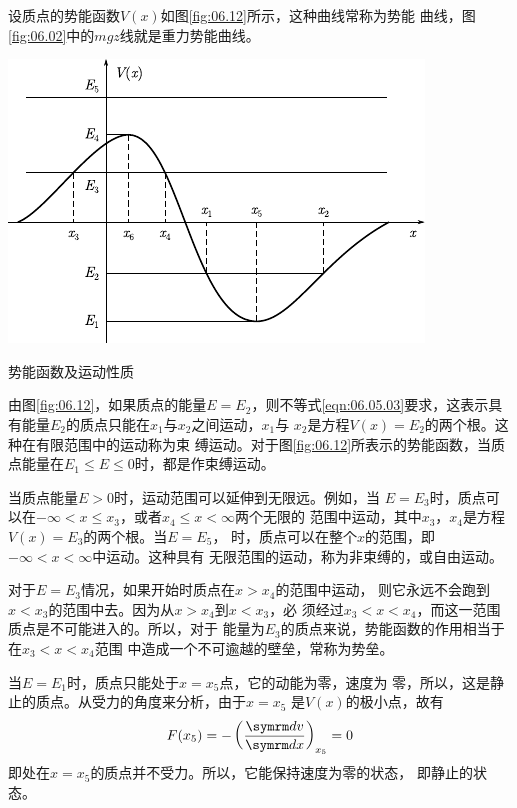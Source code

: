 设质点的势能函数$  V ( x )   $如图\ref{fig:06.12}\;所示，这种曲线常称为势能
曲线，图\ref{fig:06.02}\;中的$ mgz $线就是重力势能曲线。
\begin{figurex}
    \centering
    \includegraphics{figure/fig06.12}
    \caption{势能函数及运动性质}
    \label{fig:06.12}
\end{figurex}

由图\ref{fig:06.12}，如果质点的能量$ E=E_2 $，则不等式\eqref{eqn:06.05.03}要求，这表示具有能量$ E_2 $的质点只能在$ x_1 $与$ x_2 $之间运动，$ x_1 $与
$ x_2 $是方程$ V (x) = E_2 $的两个根。这种在有限范围中的运动称为束
缚运动。对于图\ref{fig:06.12}\;所表示的势能函数，当质点能量在$ E_1 \leqslant E \leqslant 0 $时，都是作束缚运动。

当质点能量$  E > 0  $时，运动范围可以延伸到无限远。例如，当
$ E = E _ 3 $时，质点可以在$ -\infty < x \leqslant x_3 $，或者$ x_4 \leqslant x < \infty $两个无限的
范围中运动，其中$ x_3 $，$ x_4 $是方程$  V ( x ) = E _ { 3 }   $的两个根。当$  E = E _ 5  $，
时，质点可以在整个$ x $的范围，即$  - \infty < x < \infty   $中运动。这种具有
无限范围的运动，称为非束缚的，或自由运动。

对于$  E = E _ 3  $情况，如果开始时质点在$  x > x _ { 4 }   $的范围中运动，
则它永远不会跑到$ x < x_3 $的范围中去。因为从$  x > x _ { 4 }   $到$  x < x _ 3 $，必
须经过$ x_3 < x < x_4 $，而这一范围质点是不可能进入的。所以，对于
能量为$ E_3 $的质点来说，势能函数的作用相当于在$  x _ { 3 } < x < x _ { 4 } $范围
中造成一个不可逾越的壁垒，常称为势垒。

当$  E = E _ 1 $时，质点只能处于$ x = x_5 $点，它的动能为零，速度为
零，所以，这是静止的质点。从受力的角度来分析，由于$ x = x_5 $
是$ V(x) $的极小点，故有
\begin{equation*}
    F ( x _ { 5 } ) = - \left( \frac { \dif v } { \dif x } \right) _ { x _ 5 } = 0
\end{equation*}
即处在$ x = x_5 $的质点并不受力。所以，它能保持速度为零的状态，
即静止的状态。

